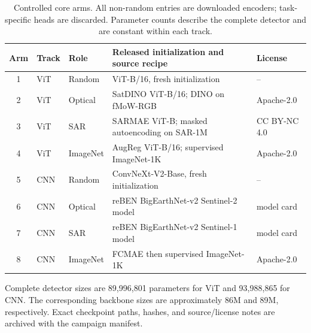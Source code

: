 \begin{table}[t]
\caption{Controlled core arms. All non-random entries are downloaded encoders;
task-specific heads are discarded. Parameter counts describe the complete
detector and are constant within each track.}
\label{tab:arms}
\centering
\scriptsize
\setlength{\tabcolsep}{3.2pt}
\begin{tabularx}{\textwidth}{@{}cllXl@{}}
\toprule
Arm & Track & Role & Released initialization and source recipe & License \\
\midrule
1 & ViT & Random & ViT-B/16, fresh initialization & -- \\
2 & ViT & Optical & SatDINO ViT-B/16; DINO on fMoW-RGB & Apache-2.0 \\
3 & ViT & SAR & SARMAE ViT-B; masked autoencoding on SAR-1M & CC BY-NC 4.0 \\
4 & ViT & ImageNet & AugReg ViT-B/16; supervised ImageNet-1K & Apache-2.0 \\
\midrule
5 & CNN & Random & ConvNeXt-V2-Base, fresh initialization & -- \\
6 & CNN & Optical & reBEN BigEarthNet-v2 Sentinel-2 model & model card \\
7 & CNN & SAR & reBEN BigEarthNet-v2 Sentinel-1 model & model card \\
8 & CNN & ImageNet & FCMAE then supervised ImageNet-1K & Apache-2.0 \\
\bottomrule
\end{tabularx}
\vspace{2pt}
\parbox{\textwidth}{\scriptsize Complete detector sizes are 89,996,801
parameters for ViT and 93,988,865 for CNN. The corresponding backbone sizes
are approximately 86M and 89M, respectively. Exact checkpoint paths, hashes,
and source/license notes are archived with the campaign manifest.}
\end{table}

